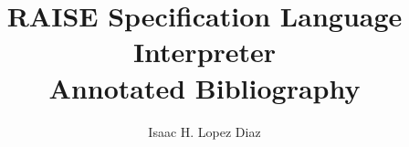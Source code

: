 \documentclass{article}
\title{RAISE Specification Language Interpreter \\ Annotated Bibliography}
\author{Isaac H. Lopez Diaz}
\begin{document}
\maketitle

\nocite{*}


\end{document}
